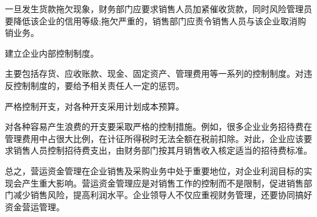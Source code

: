 \begin{enumerate.zh}
        一旦发生货款拖欠现象，财务部门应要求销售人员加紧催收货款，同时风险管理员要降低该企业的信用等级;拖欠严重的，销售部门应责令销售人员与该企业取消购销业务。

        \item  建立企业内部控制制度。

        主要包括存货、应收账款、现金、固定资产、管理费用等一系列的控制制度。对违反控制制度的，要给予相关责任人一定的惩罚。

        \item  严格控制开支，对各种开支采用计划成本预算。

        对各种容易产生浪费的开支要采取严格的控制措施。例如，很多企业业务招待费在管理费用中占很大比例，在计征所得税时无法全额在税前扣除。对此，企业应该要求销售人员控制招待费支出，由财务部门按其月销售收入核定适当的招待费标准。
    \end{enumerate.zh}

    总之，营运资金管理在企业销售及采购业务中处于重要地位，对企业利润目标的实现会产生重大影响。营运资金管理应是对销售工作的控制而不是限制，促进销售部门减少销售风险，提高利润水平。企业领导人不仅应重视财务管理，还要协同搞好资金营运管理。
